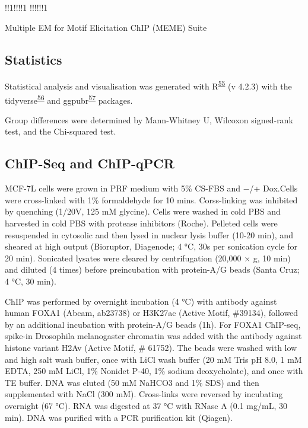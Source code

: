 \documentclass[
  12pt,
]{article}
\begin{document}
!!1!!!!1
!!!!!!1

Multiple EM for Motif Elicitation ChIP (MEME) Suite

\hypertarget{statistics}{%
\subsection{Statistics}\label{statistics}}

Statistical analysis and visualisation was generated with R\textsuperscript{\protect\hyperlink{ref-r}{55}} (v 4.2.3) with the tidyverse\textsuperscript{\protect\hyperlink{ref-wickham2019}{56}} and ggpubr\textsuperscript{\protect\hyperlink{ref-ggpubr}{57}} packages.

Group differences were determined by Mann-Whitney U, Wilcoxon signed-rank test, and the Chi-squared test.

\hypertarget{chip-seq-and-chip-qpcr}{%
\subsection{ChIP-Seq and ChIP-qPCR}\label{chip-seq-and-chip-qpcr}}

MCF-7L cells were grown in PRF medium with 5\% CS-FBS and −/+ Dox.Cells were cross-linked with 1\% formaldehyde for 10 mins.
Corss-linking was inhibited by quenching (1/20V, 125 mM glycine).
Cells were washed in cold PBS and harvested in cold PBS with protease inhibitors (Roche).
Pelleted cells were resuspended in cytosolic and then lysed in nuclear lysis buffer (10-20 min), and sheared at high output (Bioruptor, Diagenode; 4 °C, 30s per sonication cycle for 20 min).
Sonicated lysates were cleared by centrifugation (20,000 × g, 10 min) and diluted (4 times) before preincubation with protein-A/G beads (Santa Cruz; 4 °C, 30 min).

ChIP was performed by overnight incubation (4 °C) with antibody against human FOXA1 (Abcam, ab23738) or H3K27ac (Active Motif, \#39134), followed by an additional incubation with protein-A/G beads (1h).
For FOXA1 ChIP-seq, spike-in Drosophila melanogaster chromatin was added with the antibody against histone variant H2Av (Active Motif, \# 61752).
The beads were washed with low and high salt wash buffer, once with LiCl wash buffer (20 mM Tris pH 8.0, 1 mM EDTA, 250 mM LiCl, 1\% Nonidet P-40, 1\% sodium deoxycholate), and once with TE buffer.
DNA was eluted (50 mM NaHCO3 and 1\% SDS) and then supplemented with NaCl (300 mM).
Cross-links were reversed by incubating overnight (67 °C).
RNA was digested at 37 °C with RNase A (0.1 mg/mL, 30 min).
DNA was purified with a PCR purification kit (Qiagen).
\end{document}
